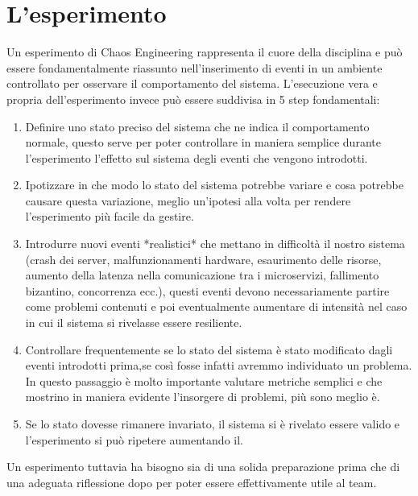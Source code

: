 \section{L'esperimento}

Un esperimento di Chaos Engineering rappresenta il cuore della disciplina e può essere fondamentalmente riassunto nell'inserimento di eventi in un ambiente controllato per osservare il comportamento del sistema.
L'esecuzione vera e propria dell'esperimento invece può essere suddivisa in 5 step fondamentali:
\begin{enumerate}
    \item Definire uno stato preciso del sistema che ne indica il comportamento normale, questo serve per poter controllare in maniera semplice durante l'esperimento l'effetto sul sistema degli eventi che vengono introdotti.
    \item Ipotizzare in che modo lo stato del sistema potrebbe variare e cosa potrebbe causare questa variazione, meglio un'ipotesi alla volta per rendere l'esperimento più facile da gestire.
    \item Introdurre nuovi eventi *realistici* che mettano in difficoltà il nostro sistema (crash dei server, malfunzionamenti hardware, esaurimento delle risorse, aumento della latenza nella comunicazione tra i microservizi, fallimento bizantino, concorrenza ecc.), questi eventi devono necessariamente partire come problemi contenuti e poi eventualmente aumentare di intensità nel caso in cui il sistema si rivelasse essere resiliente.
    \item Controllare frequentemente se lo stato del sistema è stato modificato dagli eventi introdotti prima,se così fosse infatti avremmo individuato un problema. In questo passaggio è molto importante valutare metriche semplici e che mostrino in maniera evidente l'insorgere di problemi, più sono meglio è.
    \item Se lo stato dovesse rimanere invariato, il sistema si è rivelato essere valido e l'esperimento si può ripetere aumentando il.
\end{enumerate}
Un esperimento tuttavia ha bisogno sia di una solida preparazione prima che di una adeguata riflessione dopo per poter essere effettivamente utile al team.

